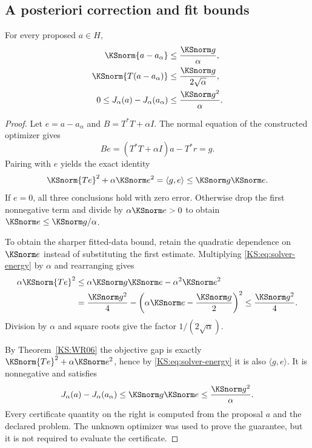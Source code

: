 \subsection{A posteriori correction and fit bounds}
\begin{KStheorem}\label{KS:WR13}
For every proposed $a\in H$,
\begin{align}
 \KSnorm{a-a_\alpha}&\le\frac{\KSnorm g}{\alpha},\label{KS:eq:solver-error}\\
 \KSnorm{T(a-a_\alpha)}&\le\frac{\KSnorm g}{2\sqrt\alpha},\label{KS:eq:solver-fit}\\
 0\le J_\alpha(a)-J_\alpha(a_\alpha)&\le\frac{\KSnorm g^2}{\alpha}.
 \label{KS:eq:solver-objective}
\end{align}
\end{KStheorem}
\begin{proof}
Let $e=a-a_\alpha$ and $B=T^*T+\alpha I$. The normal equation of the constructed optimizer gives
\[
 Be=(T^*T+\alpha I)a-T^*r=g.
\]
Pairing with $e$ yields the exact identity
\begin{equation}\label{KS:eq:solver-energy}
 \KSnorm{Te}^2+\alpha\KSnorm e^2=\langle g,e\rangle
 \le\KSnorm g\KSnorm e.
\end{equation}
If $e=0$, all three conclusions hold with zero error. Otherwise drop the first nonnegative term and divide by $\alpha\KSnorm e>0$ to obtain $\KSnorm e\le\KSnorm g/\alpha$.

To obtain the sharper fitted-data bound, retain the quadratic dependence on $\KSnorm e$ instead of substituting the first estimate. Multiplying \eqref{KS:eq:solver-energy} by $\alpha$ and rearranging gives
\[
\begin{aligned}
 \alpha\KSnorm{Te}^2
 &\le\alpha\KSnorm g\KSnorm e-\alpha^2\KSnorm e^2\\
 &=\frac{\KSnorm g^2}{4}
     -\left(\alpha\KSnorm e-\frac{\KSnorm g}{2}\right)^2
 \le\frac{\KSnorm g^2}{4}.
\end{aligned}
\]
Division by $\alpha$ and square roots give the factor $1/(2\sqrt\alpha)$.

By Theorem~\ref{KS:WR06} the objective gap is exactly $\KSnorm{Te}^2+\alpha\KSnorm e^2$, hence by \eqref{KS:eq:solver-energy} it is also $\langle g,e\rangle$. It is nonnegative and satisfies
\[
 J_\alpha(a)-J_\alpha(a_\alpha)
 \le\KSnorm g\KSnorm e\le\frac{\KSnorm g^2}{\alpha}.
\]
Every certificate quantity on the right is computed from the proposal $a$ and the declared problem. The unknown optimizer was used to prove the guarantee, but it is not required to evaluate the certificate.
\end{proof}

